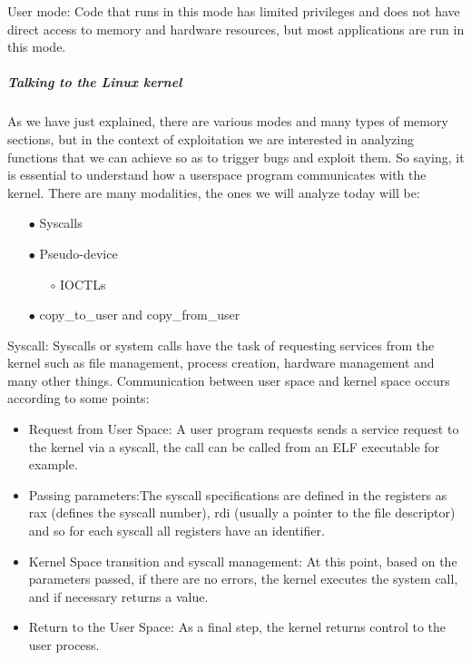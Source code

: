 \documentclass{report}
\begin{document}
    User mode: Code that runs in this mode has limited privileges and does not have direct access to memory and hardware resources, but most applications are run in this mode.\newline
    \subparagraph{Talking to the Linux kernel}
    As we have just explained, there are various modes and many types of memory sections, but in the context of exploitation we are interested in analyzing functions that we can achieve so as to trigger bugs and exploit them.\newline
    So saying, it is essential to understand how a userspace program communicates with the kernel.
    There are many modalities, the ones we will analyze today will be:\newline
    \begin{itemize}
        \item[$\bullet$] Syscalls
        \item[$\bullet$] Pseudo-device
        \begin{itemize}
            \item[$\circ$] IOCTLs
        \end{itemize}
        \item[$\bullet$] copy\_to\_user and copy\_from\_user

    \end{itemize}
    \clearpage
    Syscall: 
    Syscalls or system calls have the task of requesting services from the kernel such as file management, process creation, hardware management and many other things.\newline
    Communication between user space and kernel space occurs according to some points:\newline
    \begin{itemize}
    \item Request from User Space: A user program requests sends a service request to the kernel via a syscall, the call can be called from an ELF executable for example.\newline
    \item Passing parameters:The syscall specifications are defined in the registers as rax (defines the syscall number), rdi (usually a pointer to the file descriptor) and so for each syscall all registers have an identifier.\newline
    \item Kernel Space transition and syscall management: At this point, based on the parameters passed, if there are no errors, the kernel executes the system call, and if necessary returns a value.\newline
    \item Return to the User Space: As a final step, the kernel returns control to the user process.\newline
\end{itemize}
\end{document}
